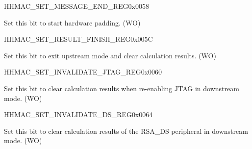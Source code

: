\begin{register}{H}{HMAC\_SET\_MESSAGE\_END\_REG}{0x0058}\label{regdesc:HMACSETMESSAGEENDREG}
%
%
\regnewline%
\begin{regdesc}\begin{reglist}
\label{fielddesc:HMACSETTEXTEND}\item [HMAC\_SET\_TEXT\_END] Set this bit to start hardware padding. (WO)
\end{reglist}\end{regdesc}
\end{register}


\begin{register}{H}{HMAC\_SET\_RESULT\_FINISH\_REG}{0x005C}\label{regdesc:HMACSETRESULTFINISHREG}
%
%
\regnewline%
\begin{regdesc}\begin{reglist}
\label{fielddesc:HMACSETRESULTEND}\item [HMAC\_SET\_RESULT\_END] Set this bit to exit upstream mode and clear calculation results. (WO)
\end{reglist}\end{regdesc}
\end{register}


\begin{register}{H}{HMAC\_SET\_INVALIDATE\_JTAG\_REG}{0x0060}\label{regdesc:HMACSETINVALIDATEJTAGREG}
%
%
\regnewline%
\begin{regdesc}\begin{reglist}
\label{fielddesc:HMACSETINVALIDATEJTAG}\item [HMAC\_SET\_INVALIDATE\_JTAG] Set this bit to clear calculation results when re-enabling JTAG in downstream mode. (WO)
\end{reglist}\end{regdesc}
\end{register}


\begin{register}{H}{HMAC\_SET\_INVALIDATE\_DS\_REG}{0x0064}\label{regdesc:HMACSETINVALIDATEDSREG}
%
%
\regnewline%
\begin{regdesc}\begin{reglist}
\label{fielddesc:HMACSETINVALIDATEDS}\item [HMAC\_SET\_INVALIDATE\_DS] Set this bit to clear calculation results of the RSA\_DS peripheral in downstream mode. (WO)
\end{reglist}\end{regdesc}
\end{register}


